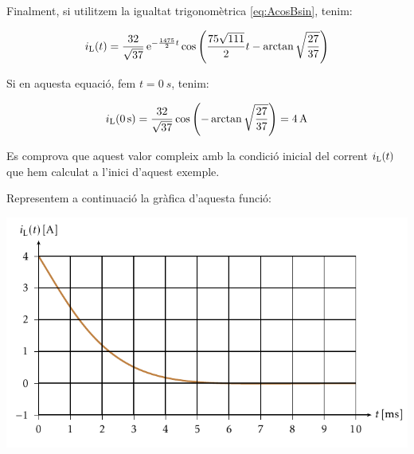 \begin{exemple}
    Finalment, si utilitzem la igualtat trigonom\`{e}trica
    \eqref{eq:AcosBsin}, tenim:

    \[
    i_\mathrm{L}(t) = \frac{32}{\sqrt{37}}\,\mathrm{e}^{-\frac{1475}{2}t}
    \cos\left(\frac{75\sqrt{111}}{2} t - \arctan
    \sqrt{\frac{27}{37}}\right)
    \]

    Si en aquesta equaci\'{o}, fem $t=\SI{0}{s}$, tenim:

    \[
        i_\mathrm{L}(\SI{0}{s}) = \frac{32}{\sqrt{37}} \cos\left( - \arctan
    \sqrt{\frac{27}{37}}\right) = \SI{4}{A}
    \]

    Es comprova que aquest valor compleix amb la condici\'{o} inicial del
    corrent $i_\mathrm{L}(t)$ que hem calculat a l'inici d'aquest exemple.

    Representem a continuaci\'{o} la gr\`{a}fica d'aquesta funci\'{o}:

    \begin{center}
        \includegraphics{Imatges/Cap-Laplace-Exemple3-Corrent.pdf}
    \end{center}
\end{exemple}


